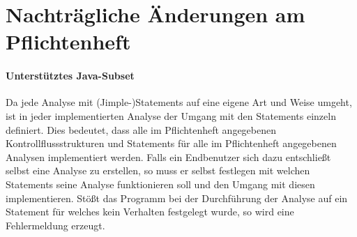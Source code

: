 \part{Nachträgliche Änderungen am Pflichtenheft}

\subsection*{Unterstütztes Java-Subset} 
Da jede Analyse mit (Jimple-)Statements auf eine eigene Art und Weise umgeht, ist in jeder implementierten Analyse der Umgang mit den Statements einzeln definiert.
Dies bedeutet, dass alle im Pflichtenheft angegebenen Kontrollflussstrukturen und Statements für alle im Pflichtenheft angegebenen Analysen implementiert werden.
Falls ein Endbenutzer sich dazu entschließt selbst eine Analyse zu erstellen, so muss er selbst festlegen mit welchen Statements seine Analyse funktionieren soll und den Umgang mit diesen implementieren.
Stößt das Programm bei der Durchführung der Analyse auf ein Statement für welches kein Verhalten festgelegt wurde, so wird eine Fehlermeldung erzeugt.